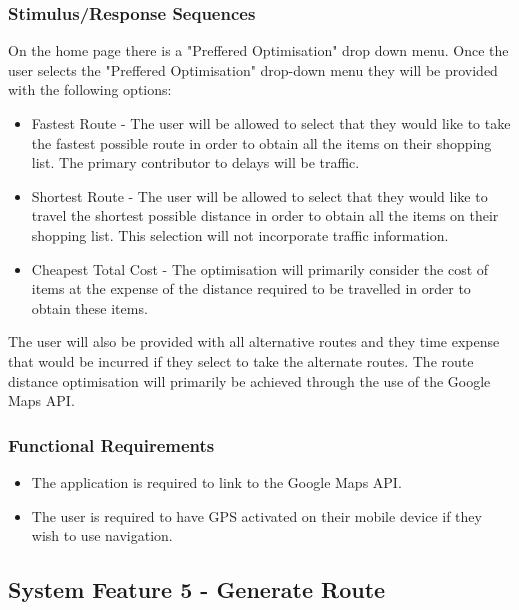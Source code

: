 \documentclass[10pt, a4paper, twocolumn]{scrartcl}
\begin{document}
			\subsubsection{Stimulus/Response Sequences}
			
				On the home page there is a "Preffered Optimisation" drop down menu. Once the user selects the "Preffered Optimisation" drop-down menu they will be provided with the following options:
				
				\begin{itemize}
					\item Fastest Route - The user will be allowed to select that they would like to take the fastest possible route in order to obtain all the items on their shopping list. The primary contributor to delays will be traffic.
					\item Shortest Route - The user will be allowed to select that they would like to travel the shortest possible distance in order to obtain all the items on their shopping list. This selection will not incorporate traffic information.
					\item Cheapest Total Cost - The optimisation will primarily consider the cost of items at the expense of the distance required to be travelled in order to obtain these items. 
				\end{itemize}
				
				The user will also be provided with all alternative routes and they time expense that would be incurred if they select to take the alternate routes. The route distance optimisation will primarily be achieved through the use of the Google Maps API.
			
			\subsubsection{Functional Requirements}
			
				\begin{itemize}
					\item The application is required to link to the Google Maps API.
					\item The user is required to have GPS activated on their mobile device if they wish to use navigation.
				\end{itemize}
	
		\subsection{System Feature 5 - Generate Route}
	
\end{document}

